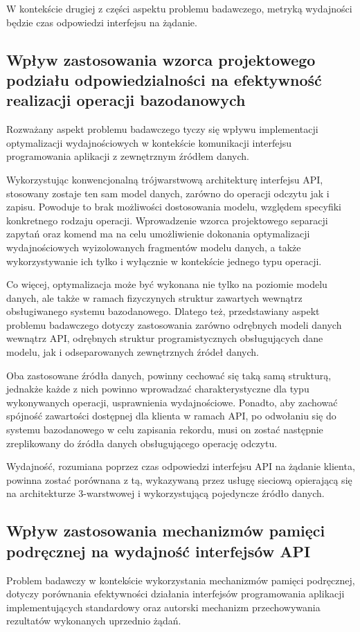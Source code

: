 W kontekście drugiej z części aspektu problemu badawczego, metryką wydajności będzie czas odpowiedzi interfejsu na żądanie.
\subsection*{Wpływ zastosowania wzorca projektowego podziału odpowiedzialności na efektywność realizacji operacji bazodanowych}
Rozważany aspekt problemu badawczego tyczy się wpływu implementacji optymalizacji wydajnościowych w kontekście komunikacji interfejsu programowania aplikacji z zewnętrznym źródłem danych.

Wykorzystując konwencjonalną trójwarstwową architekturę interfejsu API, stosowany zostaje ten sam model danych, zarówno do operacji odczytu jak i zapisu. Powoduje to brak możliwości dostosowania modelu, względem specyfiki konkretnego rodzaju operacji. Wprowadzenie wzorca projektowego separacji zapytań oraz komend ma na celu umożliwienie dokonania optymalizacji wydajnościowych wyizolowanych fragmentów modelu danych, a także wykorzystywanie ich tylko i wyłącznie w kontekście jednego typu operacji.

Co więcej, optymalizacja może być wykonana nie tylko na poziomie modelu danych, ale także w ramach fizyczynych struktur zawartych wewnątrz obsługiwanego systemu bazodanowego. Dlatego też, przedstawiany aspekt problemu badawczego dotyczy zastosowania zarówno odrębnych modeli danych wewnątrz API, odrębnych struktur programistycznych obsługujących dane modelu, jak i odseparowanych zewnętrznych źródeł danych.

Oba zastosowane źródła danych, powinny cechować się taką samą strukturą, jednakże każde z nich powinno wprowadzać charakterystyczne dla typu wykonywanych operacji, usprawnienia wydajnościowe. Ponadto, aby zachować spójność zawartości dostępnej dla klienta w ramach API, po odwołaniu się do systemu bazodanowego w celu zapisania rekordu, musi on zostać następnie zreplikowany do źródła danych obsługującego operację odczytu.

Wydajność, rozumiana poprzez czas odpowiedzi interfejsu API na żądanie klienta, powinna zostać porównana z tą, wykazywaną przez usługę sieciową opierającą się na architekturze 3-warstwowej i wykorzystującą pojedyncze źródło danych.
\subsection*{Wpływ zastosowania mechanizmów pamięci podręcznej na wydajność interfejsów API}
Problem badawczy w kontekście wykorzystania mechanizmów pamięci podręcznej, dotyczy porównania efektywności działania interfejsów programowania aplikacji implementujących standardowy oraz autorski mechanizm przechowywania rezultatów wykonanych uprzednio żądań.

